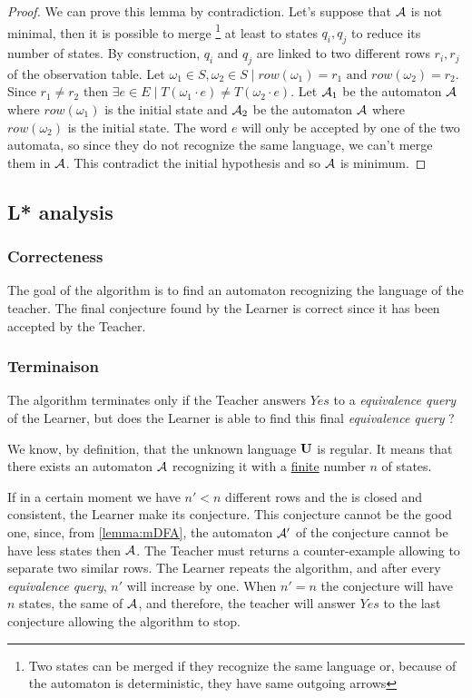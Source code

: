 \begin{proof}
  We can prove this lemma by contradiction. Let's suppose that $\mathcal{A}$ is not minimal, then it is possible to merge \footnote{Two states can be merged if they recognize the same language or, because of the automaton is deterministic, they have same outgoing arrows} at least to states $q_i, q_j$ to reduce its number of states.
  By construction, $q_i$ and $q_j$ are linked to two different rows $r_i, r_j$ of the observation table. Let $\omega_1 \in S, \omega_2 \in S \mid row(\omega_1) = r_1 \text{ and } row(\omega_2) = r_2$. Since $r_1 \neq r_2 \text{ then } \exists e \in E \mid T(\omega_1 \cdot e) \neq T(\omega_2 \cdot e)$. Let $\mathcal{A}_1$ be the automaton $\mathcal{A}$ where $row(\omega_1)$ is the initial state and $\mathcal{A}_2$ be the automaton $\mathcal{A}$ where $row(\omega_2)$ is the initial state. The word $e$ will only be accepted by one of the two automata, so since they do not recognize the same language, we can't merge them in $\mathcal{A}$.
  This contradict the initial hypothesis and so $\mathcal{A}$ is minimum.
\end{proof}

\subsection{L* analysis}
\subsubsection{Correcteness}
The goal of the algorithm is to find an automaton recognizing the language of the teacher. The final conjecture found by the Learner is correct since it has been accepted by the Teacher.

\subsubsection{Terminaison}
The algorithm terminates only if the Teacher answers $Yes$ to a \textit{equivalence query} of the Learner, but does the Learner is able to find this final \textit{equivalence query} ?

We know, by definition, that the unknown language $\mathbf{U}$ is regular. It means that there exists an automaton $\mathcal{A}$ recognizing it with a \underline{finite} number $n$ of states.

If in a certain moment we have $n' < n$ different rows and the \OT is closed and consistent, the Learner make its conjecture. This conjecture cannot be the good one, since, from \cref{lemma:mDFA}, the automaton $\mathcal{A}'$ of the conjecture cannot be have less states then $\mathcal{A}$. The Teacher must returns a counter-example allowing to separate two similar rows. The Learner repeats the algorithm, and after every \textit{equivalence query}, $n'$ will increase by one. When $n' = n$ the conjecture will have $n$ states, the same of $\mathcal{A}$, and therefore, the teacher will answer $Yes$ to the last conjecture allowing the algorithm to stop.


